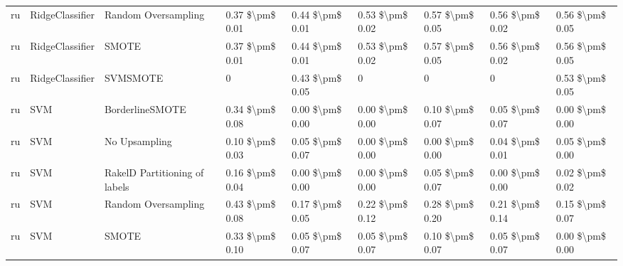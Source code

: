 \begin{tabular}{lllllllll}
      ru &                 RidgeClassifier &           Random Oversampling & 0.37 \$\textbackslash pm\$ 0.01 &           0.44 \$\textbackslash pm\$ 0.01 &       0.53 \$\textbackslash pm\$ 0.02 &        0.57 \$\textbackslash pm\$ 0.05 &                         0.56 \$\textbackslash pm\$ 0.02 &     0.56 \$\textbackslash pm\$ 0.05 \\
      ru &                 RidgeClassifier &                         SMOTE & 0.37 \$\textbackslash pm\$ 0.01 &           0.44 \$\textbackslash pm\$ 0.01 &       0.53 \$\textbackslash pm\$ 0.02 &        0.57 \$\textbackslash pm\$ 0.05 &                         0.56 \$\textbackslash pm\$ 0.02 &     0.56 \$\textbackslash pm\$ 0.05 \\
      ru &                 RidgeClassifier &                      SVMSMOTE &               0 &           0.43 \$\textbackslash pm\$ 0.05 &                     0 &                      0 &                                       0 &     0.53 \$\textbackslash pm\$ 0.05 \\
      ru &                             SVM &               BorderlineSMOTE & 0.34 \$\textbackslash pm\$ 0.08 &           0.00 \$\textbackslash pm\$ 0.00 &       0.00 \$\textbackslash pm\$ 0.00 &        0.10 \$\textbackslash pm\$ 0.07 &                         0.05 \$\textbackslash pm\$ 0.07 &     0.00 \$\textbackslash pm\$ 0.00 \\
      ru &                             SVM &                 No Upsampling & 0.10 \$\textbackslash pm\$ 0.03 &           0.05 \$\textbackslash pm\$ 0.07 &       0.00 \$\textbackslash pm\$ 0.00 &        0.00 \$\textbackslash pm\$ 0.00 &                         0.04 \$\textbackslash pm\$ 0.01 &     0.05 \$\textbackslash pm\$ 0.00 \\
      ru &                             SVM & RakelD Partitioning of labels & 0.16 \$\textbackslash pm\$ 0.04 &           0.00 \$\textbackslash pm\$ 0.00 &       0.00 \$\textbackslash pm\$ 0.00 &        0.05 \$\textbackslash pm\$ 0.07 &                         0.00 \$\textbackslash pm\$ 0.00 &     0.02 \$\textbackslash pm\$ 0.02 \\
      ru &                             SVM &           Random Oversampling & 0.43 \$\textbackslash pm\$ 0.08 &           0.17 \$\textbackslash pm\$ 0.05 &       0.22 \$\textbackslash pm\$ 0.12 &        0.28 \$\textbackslash pm\$ 0.20 &                         0.21 \$\textbackslash pm\$ 0.14 &     0.15 \$\textbackslash pm\$ 0.07 \\
      ru &                             SVM &                         SMOTE & 0.33 \$\textbackslash pm\$ 0.10 &           0.05 \$\textbackslash pm\$ 0.07 &       0.05 \$\textbackslash pm\$ 0.07 &        0.10 \$\textbackslash pm\$ 0.07 &                         0.05 \$\textbackslash pm\$ 0.07 &     0.00 \$\textbackslash pm\$ 0.00 \\

\end{tabular}
